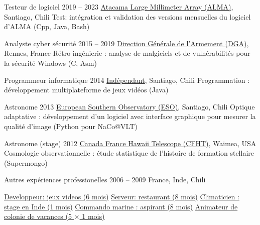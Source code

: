 \begin{joblist}[\tbfwidth][8.4][\tbfyeary]

\setlength{\parskip}{0.3cm}
\vspace{-0.4cm}

\item[Testeur de logiciel]{2019 -- 2023}
  {
  \href{https://www.almaobservatory.org}{Atacama Large Millimeter Array (ALMA)}, Santiago, Chili
  }
  {Test: intégration et validation des versions mensuelles du logiciel d'ALMA (Cpp, Java, Bash)}

\item[Analyste cyber sécurité]{2015 -- 2019}
  {
  \href{http://www.defense.gouv.fr/dga/}{Direction Générale de l'Armement (DGA)}, Rennes, France
  }
  {Rétro-ingénierie : analyse de malgiciels et de vulnérabilités pour la sécurité Windows (C, Asm)}

\item[Programmeur informatique]{2014}
  {
  \tbfihuman
  \href{https://tinmarino.github.io/page/}{Indépendant}, Santiago, Chili
  }
  {Programmation : développement multiplateforme de jeux vidéos (Java)}



\item[Astronome]{2013}
  {
  \href{http://www.eso.org/public/}{European Southern Observatory (ESO)}, Santiago, Chili
  }
  {Optique adaptative : développement d'un logiciel avec interface graphique pour mesurer la qualité d'image (Python pour NaCo@VLT)}

\item[Astronome (stage)]{2012}
  {
\href{https://www.cfht.hawaii.edu/}{Canada France Hawaii Telescope (CFHT)}, Waimea, USA
  }
  {Cosmologie observationnelle : étude statistique de l'histoire de formation stellaire (Supermongo)}

\item[Autres expériences professionelles]{2006 -- 2009}
  {
  France, Inde, Chili
  }
  {
    \renewcommand\labelitemi{{}}
    \vspace{-0.8cm}
    \setlength{\parskip}{0cm}
    \begin{itemize}[leftmargin=*, label=\textbullet]
    \setlength\itemsep{0cm}

    \cvitem \href{https://tinmarino.github.io/page/}{Developpeur: jeux videos (6 mois)}
    \cvitem \href{http://www.insertcoin.cl/}{Serveur: restaurant (8 mois)}
    \cvitem \href{http://www.dupont.co.in/}{Climaticien : stage en Inde (1 mois)}
    \cvitem \href{http://www.defense.gouv.fr/marine/organisation/forces/fusiliers-marins-et-commandos/force-maritime-des-fusiliers-marins-et-commandos}{Commando marine : aspirant (8 mois)}
    \cvitem \href{http://www.vacances-pour-tous.org/}{Animateur de colonie de vacances (5 $\times$ 1 mois)}


\end{itemize}}
\end{joblist}
